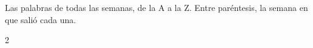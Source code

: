 \section*{\lblDiccionario}

Las palabras de todas las semanas, de la A a la Z. Entre paréntesis, la
semana en que salió cada una.

\begin{multicols}{2}
\begin{itemize}[leftmargin=0mm, label={}, itemsep=3mm, topsep=0mm]

\end{itemize}
\end{multicols}
\newpage
